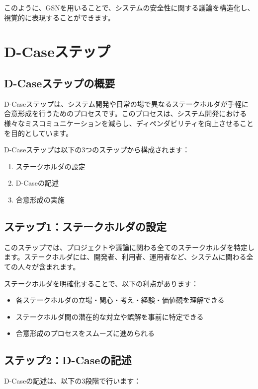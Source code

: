 このように、GSNを用いることで、システムの安全性に関する議論を構造化し、視覚的に表現することができます。

\section{D-Caseステップ}

\subsection{D-Caseステップの概要}

D-Caseステップは、システム開発や日常の場で異なるステークホルダが手軽に合意形成を行うためのプロセスです。このプロセスは、システム開発における様々なミスコミュニケーションを減らし、ディペンダビリティを向上させることを目的としています。

D-Caseステップは以下の3つのステップから構成されます：

\begin{enumerate}
    \item ステークホルダの設定
    \item D-Caseの記述
    \item 合意形成の実施
\end{enumerate}

\subsection{ステップ1：ステークホルダの設定}

このステップでは、プロジェクトや議論に関わる全てのステークホルダを特定します。ステークホルダには、開発者、利用者、運用者など、システムに関わる全ての人々が含まれます。

ステークホルダを明確化することで、以下の利点があります：

\begin{itemize}
    \item 各ステークホルダの立場・関心・考え・経験・価値観を理解できる
    \item ステークホルダ間の潜在的な対立や誤解を事前に特定できる
    \item 合意形成のプロセスをスムーズに進められる
\end{itemize}

\subsection{ステップ2：D-Caseの記述}

D-Caseの記述は、以下の3段階で行います：


